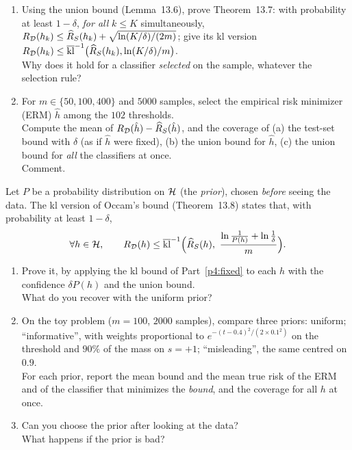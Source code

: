 \documentclass[a4paper,11pt]{article}
\begin{document}
\label{p4:union}

\begin{enumerate}
\item Using the union bound (Lemma~13.6), prove Theorem~13.7: with probability at least $1-\delta$, \emph{for all}
      $k\leq K$ simultaneously, $R_{\mathcal{D}}(h_k)\leq\widehat{R}_{S}(h_k)+\sqrt{\ln(K/\delta)/(2m)}$; give its kl version
      $R_{\mathcal{D}}(h_k)\leq\overline{\operatorname{kl}}^{-1}\big(\widehat{R}_{S}(h_k),\ln(K/\delta)/m\big)$.\\
      Why does it hold for a classifier \emph{selected} on the sample, whatever the selection rule?
\item For $m\in\{50,100,400\}$ and $5000$ samples, select the empirical risk minimizer (ERM)
      $\hat h$ among the $102$ thresholds.\\
      Compute the mean of $R_{\mathcal{D}}(\hat h)-\widehat{R}_{S}(\hat h)$, and the coverage of (a) the
      test-set bound with $\delta$ (as if $\hat h$ were fixed), (b) the union bound for $\hat h$, (c) the union bound for
      \emph{all} the classifiers at once.\\
      Comment.
\end{enumerate}

\label{p4:occam}

Let $P$ be a probability distribution on $\mathcal{H}$ (the \emph{prior}), chosen \emph{before} seeing the data. The kl version
of Occam's bound (Theorem~13.8) states that, with probability at least $1-\delta$,
\[
\forall h\in\Hcal,\qquad \RD(h)\leq\klup\Big(\RS(h),\ \frac{\ln\frac1{P(h)}+\ln\frac1\delta}{m}\Big).
\]

\begin{enumerate}
\item Prove it, by applying the kl bound of Part~\ref{p4:fixed} to each $h$ with the confidence $\delta P(h)$ and the union
      bound.\\
      What do you recover with the uniform prior?
\item On the toy problem ($m=100$, $2000$ samples), compare three priors: uniform; ``informative'', with weights
      proportional to $e^{-(t-0.4)^2/(2\times0.1^2)}$ on the threshold and $90\%$ of the mass on $s=+1$; ``misleading'',
      the same centred on $0.9$.\\
      For each prior, report the mean bound and the mean true risk of the ERM and of the classifier that minimizes the
      \emph{bound}, and the coverage for all $h$ at once.
\item Can you choose the prior after looking at the data?\\
      What happens if the prior is bad?
\end{enumerate}
\end{document}
